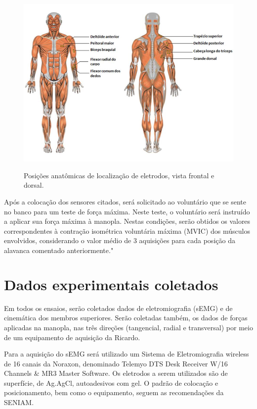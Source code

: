 \documentclass[rascunho,xindy]{Classe-Latex-FEI/fei}
\begin{document}
\begin{figure}[!htb]
\centering
\caption{Posições anatômicas de localização de eletrodos, vista frontal e dorsal. \cite{konradabc}}
\includegraphics[scale=1.0]{corpo_humano}
\label{fig:corpo_humano}
\end{figure}

Após a colocação dos sensores citados, será solicitado ao voluntário que se sente no banco para um teste de força máxima. Neste teste, o voluntário será instruído a aplicar sua força máxima à manopla. Nestas condições, serão obtidos os valores correspondentes à contração isométrica voluntária máxima (MVIC) dos músculos envolvidos, considerando o valor médio de 3 aquisições para cada posição da alavanca comentado anteriormente."

\section{Dados experimentais coletados}

Em todos os ensaios, serão coletados dados de eletromiografia (sEMG) e de cinemática dos membros superiores. Serão coletadas também, os dados de forças aplicadas na manopla, nas três direções (tangencial, radial e transversal) por meio de um equipamento de aquisição da Ricardo.

Para a aquisição do sEMG será utilizado um Sistema de Eletromiografia wireless de 16 canais da Noraxon, denominado Telemyo DTS Desk Receiver W/16 Channels \& MR3 Master Software. Os eletrodos a serem utilizados são de superfície, de Ag.AgCl, autoadesivos com gel. O padrão de colocação e posicionamento, bem como o equipamento, seguem as recomendações da SENIAM.
\end{document}
